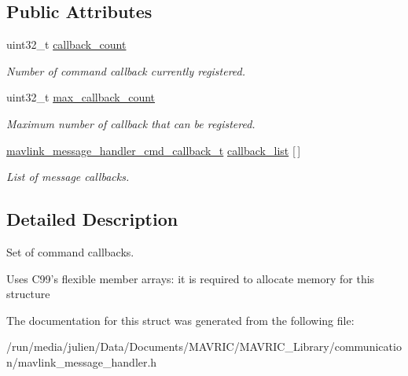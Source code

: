\subsection*{Public Attributes}
\begin{DoxyCompactItemize}
\item 
\hypertarget{structmavlink__message__handler__cmd__callback__set__t_a13d94324f0037fac3d321ecf4c638c12}{uint32\+\_\+t \hyperlink{structmavlink__message__handler__cmd__callback__set__t_a13d94324f0037fac3d321ecf4c638c12}{callback\+\_\+count}}\label{structmavlink__message__handler__cmd__callback__set__t_a13d94324f0037fac3d321ecf4c638c12}

\begin{DoxyCompactList}\small\item\em Number of command callback currently registered. \end{DoxyCompactList}\item 
\hypertarget{structmavlink__message__handler__cmd__callback__set__t_a1da5e8cdce39e8bd77e3406270cc693c}{uint32\+\_\+t \hyperlink{structmavlink__message__handler__cmd__callback__set__t_a1da5e8cdce39e8bd77e3406270cc693c}{max\+\_\+callback\+\_\+count}}\label{structmavlink__message__handler__cmd__callback__set__t_a1da5e8cdce39e8bd77e3406270cc693c}

\begin{DoxyCompactList}\small\item\em Maximum number of callback that can be registered. \end{DoxyCompactList}\item 
\hypertarget{structmavlink__message__handler__cmd__callback__set__t_abb70bd1d9b0eedd625f5a53f0d33f9e7}{\hyperlink{structmavlink__message__handler__cmd__callback__t}{mavlink\+\_\+message\+\_\+handler\+\_\+cmd\+\_\+callback\+\_\+t} \hyperlink{structmavlink__message__handler__cmd__callback__set__t_abb70bd1d9b0eedd625f5a53f0d33f9e7}{callback\+\_\+list} \mbox{[}$\,$\mbox{]}}\label{structmavlink__message__handler__cmd__callback__set__t_abb70bd1d9b0eedd625f5a53f0d33f9e7}

\begin{DoxyCompactList}\small\item\em List of message callbacks. \end{DoxyCompactList}\end{DoxyCompactItemize}


\subsection{Detailed Description}
Set of command callbacks. 

Uses C99's flexible member arrays\+: it is required to allocate memory for this structure 

The documentation for this struct was generated from the following file\+:\begin{DoxyCompactItemize}
\item 
/run/media/julien/\+Data/\+Documents/\+M\+A\+V\+R\+I\+C/\+M\+A\+V\+R\+I\+C\+\_\+\+Library/communication/mavlink\+\_\+message\+\_\+handler.\+h\end{DoxyCompactItemize}
